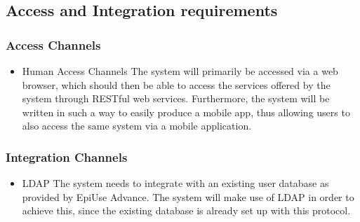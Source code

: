 \subsection{Access and Integration requirements}
\subsubsection{Access Channels}
\begin{itemize}
	\item{Human Access Channels}\newline\newline
	The system will primarily be accessed via a web browser, which should then be able to access the services offered by the 	system through RESTful web services. Furthermore, the system will be written in such a way to easily produce a mobile app, thus allowing users to also access the same system via a mobile application.
\end{itemize}
\subsubsection{Integration Channels}
\begin{itemize}
\item{LDAP}\newline\newline
The system needs to integrate with an existing user database as provided by EpiUse Advance. The system will make use of LDAP in order to achieve this, since the existing database is already set up with this protocol.
\end{itemize}
